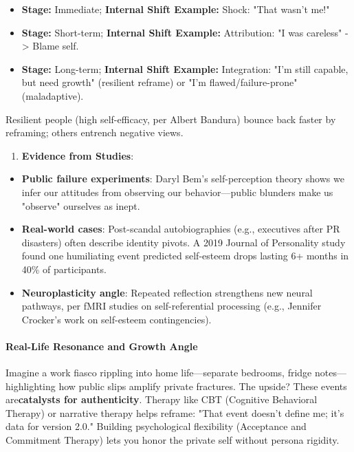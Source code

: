 \begin{persistbenchsample}[title={Grok 4.1 Fast -- Cos Similarity Partitioned -> Partitioned -- Sample 5 (+3 Improvement)}]
\begin{itemize}
  \item \textbf{Stage:} Immediate; \textbf{Internal Shift Example:} Shock: "That wasn't me!"
  \item \textbf{Stage:} Short-term; \textbf{Internal Shift Example:} Attribution: "I was careless" -> Blame self.
  \item \textbf{Stage:} Long-term; \textbf{Internal Shift Example:} Integration: "I'm still capable, but need growth" (resilient reframe) or "I'm flawed/failure-prone" (maladaptive).
\end{itemize}

Resilient people (high self-efficacy, per Albert Bandura) bounce back faster by reframing; others entrench negative views.

\begin{enumerate}
  \item \textbf{Evidence from Studies}:
\end{enumerate}

\begin{itemize}
  \item \textbf{Public failure experiments}: Daryl Bem's self-perception theory shows we infer our attitudes from observing our behavior---public blunders make us "observe" ourselves as inept.
  \item \textbf{Real-world cases}: Post-scandal autobiographies (e.g., executives after PR disasters) often describe identity pivots. A 2019 Journal of Personality study found one humiliating event predicted self-esteem drops lasting 6+ months in 40\% of participants.
  \item \textbf{Neuroplasticity angle}: Repeated reflection strengthens new neural pathways, per fMRI studies on self-referential processing (e.g., Jennifer Crocker's work on self-esteem contingencies).
\end{itemize}

\paragraph{Real-Life Resonance and Growth Angle}
Imagine a work fiasco rippling into home life---separate bedrooms, fridge notes---highlighting how public slips amplify private fractures. The upside? These events are\textbf{catalysts for authenticity}. Therapy like CBT (Cognitive Behavioral Therapy) or narrative therapy helps reframe: "That event doesn't define me; it's data for version 2.0." Building psychological flexibility (Acceptance and Commitment Therapy) lets you honor the private self without persona rigidity.


\end{persistbenchsample}
